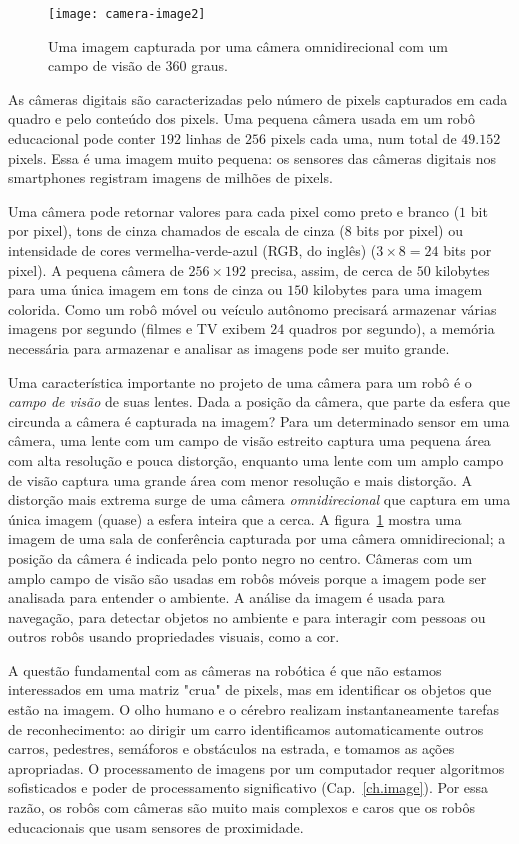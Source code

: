 \begin{figure}
\texttt{[image: camera-image2]}
\caption{Uma imagem capturada por uma câmera omnidirecional com um campo de visão de 360 graus.}\label{fig.camera}
\end{figure}

As câmeras digitais são caracterizadas pelo número de pixels capturados em cada quadro e pelo conteúdo dos pixels. Uma pequena câmera usada em um robô educacional pode conter  $192$ linhas de $256$ pixels cada uma, num total de $49.152$ pixels. Essa é uma imagem muito pequena: os sensores das câmeras digitais nos smartphones registram imagens de milhões de pixels.

Uma câmera pode retornar valores para cada pixel como preto e branco ($1$ bit por pixel), tons de cinza chamados de escala de cinza ($8$ bits por pixel) ou intensidade de cores vermelha-verde-azul (RGB, do inglês) ($3\times 8=24$ bits por pixel). A pequena câmera de $256\times 192$ precisa, assim, de cerca de $50$ kilobytes para uma única imagem em tons de cinza ou $150$ kilobytes para uma imagem colorida. Como um robô móvel ou veículo autônomo precisará armazenar várias imagens por segundo (filmes e TV exibem $24$ quadros por segundo), a memória necessária para armazenar e analisar as imagens pode ser muito grande.

Uma característica importante no projeto de uma câmera para um robô é o \emph{campo de visão} de suas lentes. Dada a posição da câmera, que parte da esfera que circunda a câmera é capturada na imagem? Para um determinado sensor em uma câmera, uma lente com um campo de visão estreito captura uma pequena área com alta resolução e pouca distorção, enquanto uma lente com um amplo campo de visão captura uma grande área com menor resolução e mais distorção. A distorção mais extrema surge de uma câmera \emph{omnidirecional} que captura em uma única imagem (quase) a esfera inteira que a cerca. A figura~\ref{fig.camera} mostra uma imagem de uma sala de conferência capturada por uma câmera omnidirecional; a posição da câmera é indicada pelo ponto negro no centro. Câmeras com um amplo campo de visão são usadas em robôs móveis porque a imagem pode ser analisada para entender o ambiente. A análise da imagem é usada para navegação, para detectar objetos no ambiente e para interagir com pessoas ou outros robôs usando propriedades visuais, como a cor.

A questão fundamental com as câmeras na robótica é que não estamos interessados em uma matriz "crua" de pixels, mas em identificar os objetos que estão na imagem. O olho humano e o cérebro realizam instantaneamente tarefas de reconhecimento: ao dirigir um carro identificamos automaticamente outros carros, pedestres, semáforos e obstáculos na estrada, e tomamos as ações apropriadas. O processamento de imagens por um computador requer algoritmos sofisticados e poder de processamento significativo (Cap.~\ref{ch.image}). Por essa razão, os robôs com câmeras são muito mais complexos e caros que os robôs educacionais que usam sensores de proximidade.

